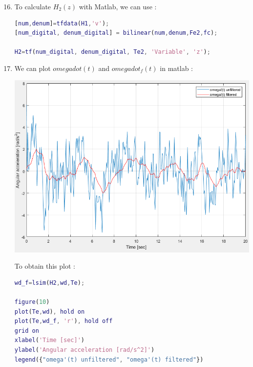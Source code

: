 \documentclass[a4paper,12pt]{article}
\begin{document}
\begin{enumerate}[label={\color{blue}\arabic*)}]
    \setcounter{enumi}{15}

    \item
    To calculate \(H_2(z)\) with Matlab, we can use :
    \begin{lstlisting}[style=Matlab-editor,language=Matlab, basicstyle=\small\ttfamily]
[num,denum]=tfdata(H1,'v');
[num_digital, denum_digital] = bilinear(num,denum,Fe2,fc);

H2=tf(num_digital, denum_digital, Te2, 'Variable', 'z');
        \end{lstlisting}

    \item
    We can plot \(omega dot(t)\) and \(omega dot_f(t)\) in matlab :
    \begin{multicols}{2}
    \begin{flushleft}
            \includegraphics[width=1\linewidth]{Images/omega_dot_filtered.png}
            \label{Figure13}
        \end{flushleft}
    \columnbreak
    To obtain this plot :
    \begin{lstlisting}[style=Matlab-editor,language=Matlab, basicstyle=\small\ttfamily]
wd_f=lsim(H2,wd,Te);

figure(10)
plot(Te,wd), hold on
plot(Te,wd_f, 'r'), hold off
grid on
xlabel('Time [sec]')
ylabel('Angular acceleration [rad/s^2]')
legend({"omega'(t) unfiltered", "omega'(t) filtered"})
        \end{lstlisting}


\end{multicols}
\end{enumerate}
\end{document}
